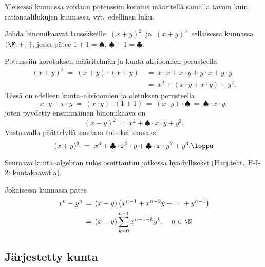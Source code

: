Yleisessä kunnassa voidaan potenssiin korotus määritellä samalla tavoin kuin rationaalilukujen 
kunnassa, vrt.\ edellinen luku.
\begin{Exa} Johda binomikaavat lausekkeille $\ (x+y)^2\ $ ja $\ (x+y)^3\ $ sellaisessa kunnassa
$(\K,+,\cdot)$, jossa pätee $1+1 = \spadesuit$, $\spadesuit+1 = \clubsuit$. \end{Exa}
\ratk Potenssiin korotuksen määritelmän ja kunta-aksioomien perusteella
\begin{align*}
(x+y)^2\ =\ (x+y) \cdot (x+y)\ &=\ x \cdot x + x \cdot y + y \cdot x + y \cdot y \\
                               &=\ x^2 + (x \cdot y + x \cdot y) + y^2.
\end{align*}
Tässä on edelleen kunta--aksioomien ja oletuksen perusteella
\[
x \cdot y + x \cdot y\ =\ (x \cdot y) \cdot (1+1)\ 
                       =\ (x \cdot y) \cdot \spadesuit\ =\ \spadesuit \cdot x \cdot y,
\]
joten pyydetty ensimmäinen binomikaava on
\[
(x+y)^2\ =\ x^2 + \spadesuit \cdot x \cdot y + y^2.
\]
Vastaavalla päättelyllä saadaan toiseksi kaavaksi
\[
(x+y)^3\ =\ x^3 + \clubsuit \cdot x^2 \cdot y + \clubsuit \cdot x \cdot y^2 + y^3. \loppu
\]

Seuraava kunta--algebran tulos osoittautuu jatkossa hyödylliseksi
(Harj.teht.\,\ref{H-I-2: kuntakaavat}a).
\begin{Prop} \label{kuntakaava} Jokaisessa kunnassa pätee
\begin{align*}
x^n-y^n\, &=\, (x-y)\left(x^{n-1}+x^{n-2}y + \ldots + y^{n-1}\right) \\
          &=\, (x-y)\sum_{k=0}^{n-1} x^{n-1-k}y^k, \quad n\in\N.
\end{align*} \end{Prop}
 
\subsection*{Järjestetty kunta}
%

